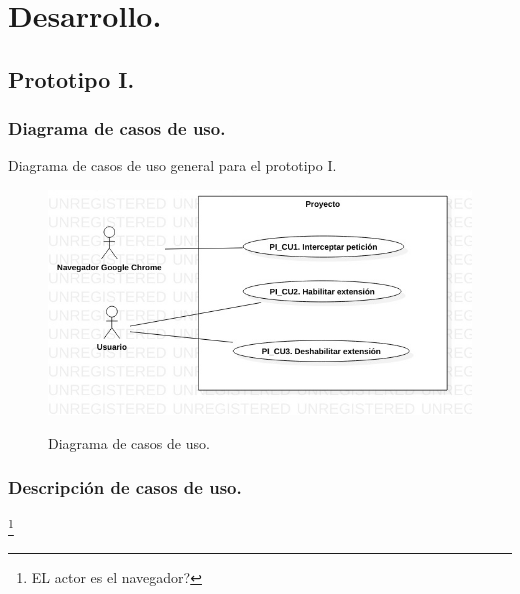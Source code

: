 \documentclass[12pt, a4paper, titlepage]{article}
\begin{document}
	\section{\textcolor{azulescom}{Desarrollo.}}
		\subsection{Prototipo I.}
			\subsubsection{Diagrama de casos de uso.}

				Diagrama de casos de uso general para el prototipo I.
				\begin{figure}[htb]
					\begin{center}
						\label{fig1} 
						\includegraphics[width=17cm]{./imagenes/UCD_1.jpg}
						\caption{Diagrama de casos de uso.}
					\end{center}
				\end{figure}\newpage	
					
			\subsubsection{Descripción de casos de uso.}
				\footnote{EL actor es el navegador?}
			
\end{document}

